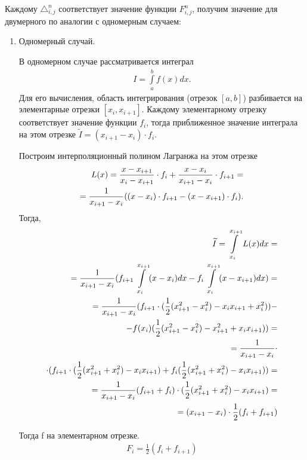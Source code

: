 \documentclass{article}
\begin{document}
Каждому $\triangle^n_{i,j}$ соответствует значение функции  $F^n_{i,j}$, получим значение для двумерного по аналогии с одномерным случаем:

\begin{enumerate}
\item Одномерный случай.

В одномерном случае рассматривается интеграл
\begin{align}
I= \int\limits_a^b f(x) dx.
\end{align}
Для его вычисления, область интегрирования (отрезок $[a,b]$) разбивается на элементарные отрезки $[x_i, x_{i+1}]$. Каждому элементарному отрезку соответствует значение функции $f_i$, тогда приближенное значение интеграла на этом отрезке $\widetilde{I}=(x_{i+1}-x_{i}) \cdot f_i$.

Построим интерполяционный полином Лагранжа на этом отрезке
\begin{align}
L(x) = \frac{x-x_{i+1}}{x_i-x_{i+1}} \cdot f_i+ \frac{x-x_i}{x_{i+1}-x_{i}} \cdot f_{i+1} = \notag \\
= \frac{1}{x_{i+1}-x_{i}} ((x-x_{i})\cdot f_{i+1}-(x-x_{i+1}) \cdot f_{i}).
\end{align}
Тогда,
\begin{align}
\widetilde{I} = \int\limits_{x_{i}}^{x_{i+1}} L(x) dx = \notag \\
= \frac{1}{x_{i+1}-x_{i}} (f_{i+1} \int\limits_{x_{i}}^{x_{i+1}} (x-x_{i}) dx - f_i \int\limits_{x_{i}}^{x_{i+1}} (x-x_{i+1}) dx) = \notag \\
= \frac{1}{x_{i+1}-x_{i}} (f_{i+1} \cdot (\frac{1}{2} (x_{i+1}^2 - x_{i}^2) -x_i x_{i+1}+x_{i}^2)) - \notag \\
- f(x_{i}) (\frac{1}{2} (x_{i+1}^2-x_{i}^2)-x_{i+1}^2+x_i x_{i+1})) = \notag \\
= \frac{1}{x_{i+1}-x_{i}} \cdot \notag \\
\cdot (f_{i+1} \cdot (\frac{1}{2} (x_{i+1}^2 + x_{i}^2) -x_i x_{i+1}) + f_i (\frac{1}{2}(x_{i+1}^2+x_{i}^2)-x_i x_{i+1})) = \notag \\
= \frac{1}{x_{i+1}-x_{i}} (f_{i+1}+ f_i) \cdot (\frac{1}{2} (x_{i+1}^2 + x_{i}^2) -x_i x_{i+1}) = \notag \\
= (x_{i+1}-x_{i}) \cdot \frac{1}{2}(f_i+f_{i+1})
\end{align}

Тогда f на элементарном отрезке.
\begin{align}
F_i = \frac{1}{2}(f_{i}+f_{i+1})
\end{align}


\end{enumerate}
\end{document}

